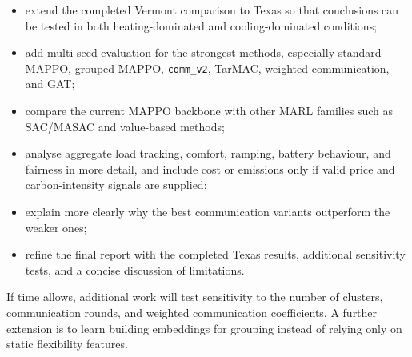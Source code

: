 \begin{itemize}
  \item extend the completed Vermont comparison to Texas so that conclusions can
  be tested in both heating-dominated and cooling-dominated conditions;
  \item add multi-seed evaluation for the strongest methods, especially standard
  MAPPO, grouped MAPPO, \texttt{comm\_v2}, TarMAC, weighted communication, and
  GAT;
  \item compare the current MAPPO backbone with other MARL families such as
  SAC/MASAC and value-based methods;
  \item analyse aggregate load tracking, comfort, ramping, battery behaviour,
  and fairness in more detail, and include cost or emissions only if valid
  price and carbon-intensity signals are supplied;
  \item explain more clearly why the best communication variants outperform the
  weaker ones;
  \item refine the final report with the completed Texas results, additional
  sensitivity tests, and a concise discussion of limitations.
\end{itemize}

If time allows, additional work will test sensitivity to the number of clusters,
communication rounds, and weighted communication coefficients. A further
extension is to learn building embeddings for grouping instead of relying only
on static flexibility features.
